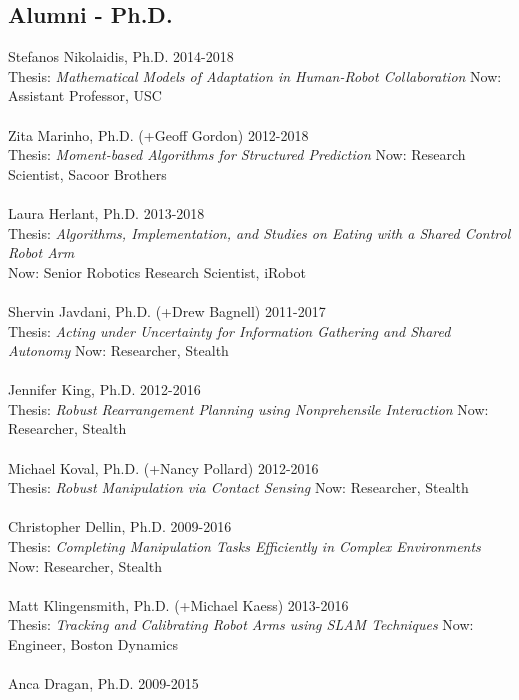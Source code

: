 \subsection{Alumni - Ph.D.}
\noindent
Stefanos Nikolaidis, Ph.D. \hfill 2014-2018\\
Thesis: \textit{Mathematical Models of Adaptation in Human-Robot Collaboration} \hfill
Now: Assistant Professor, USC\\
\\
Zita Marinho, Ph.D. (+Geoff Gordon) \hfill 2012-2018\\
Thesis: \textit{Moment-based Algorithms for Structured Prediction}\hfill
Now: Research Scientist, Sacoor Brothers\\
\\
Laura Herlant, Ph.D. \hfill 2013-2018\\
Thesis: \textit{Algorithms, Implementation, and Studies on Eating with a Shared Control Robot Arm}
\\
\phantom{a}\hfill Now: Senior Robotics Research Scientist, iRobot\\
\\
Shervin Javdani, Ph.D. (+Drew Bagnell) \hfill 2011-2017\\
Thesis: \textit{Acting under Uncertainty for Information Gathering and Shared Autonomy } \hfill Now: Researcher, Stealth\\
\\
Jennifer King, Ph.D. \hfill 2012-2016\\
Thesis: \textit{Robust Rearrangement Planning using Nonprehensile Interaction} \hfill Now: Researcher, Stealth\\
\\
Michael Koval, Ph.D. (+Nancy Pollard) \hfill 2012-2016\\
Thesis: \textit{Robust Manipulation via Contact Sensing} \hfill Now: Researcher, Stealth\\
\\
Christopher Dellin, Ph.D. \hfill 2009-2016\\
Thesis: \textit{Completing Manipulation Tasks Efficiently in Complex Environments} \hfill Now: Researcher, Stealth\\
\\
Matt Klingensmith, Ph.D. (+Michael Kaess) \hfill 2013-2016\\
Thesis: \textit{Tracking and Calibrating Robot Arms using SLAM Techniques} \hfill Now: Engineer, Boston Dynamics\\
\\
Anca Dragan, Ph.D. \hfill 2009-2015\\
